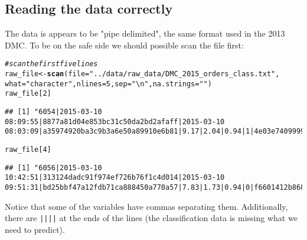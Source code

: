 \documentclass[10pt]{report}
\makeatletter
\newcommand{\hlnum}[1]{\textcolor[rgb]{0.686,0.059,0.569}{#1}}%
\newcommand{\hlstr}[1]{\textcolor[rgb]{0.192,0.494,0.8}{#1}}%
\newcommand{\hlcom}[1]{\textcolor[rgb]{0.678,0.584,0.686}{\textit{#1}}}%
\newcommand{\hlstd}[1]{\textcolor[rgb]{0.345,0.345,0.345}{#1}}%
\newcommand{\hlkwb}[1]{\textcolor[rgb]{0.69,0.353,0.396}{#1}}%
\newcommand{\hlkwc}[1]{\textcolor[rgb]{0.333,0.667,0.333}{#1}}%
\newcommand{\hlkwd}[1]{\textcolor[rgb]{0.737,0.353,0.396}{\textbf{#1}}}%
\newenvironment{kframe}{%
 \def\at@end@of@kframe{}%
 \ifinner\ifhmode%
  \def\at@end@of@kframe{\end{minipage}}%
  \begin{minipage}{\columnwidth}%
 \fi\fi%
 \def\FrameCommand##1{\hskip\@totalleftmargin \hskip-\fboxsep
 \colorbox{shadecolor}{##1}\hskip-\fboxsep
     \hskip-\linewidth \hskip-\@totalleftmargin \hskip\columnwidth}%
 \MakeFramed {\advance\hsize-\width
   \@totalleftmargin\z@ \linewidth\hsize
   \@setminipage}}%
 {\par\unskip\endMakeFramed%
 \at@end@of@kframe}
\newenvironment{knitrout}{}{} %
\makeatother
\begin{document}
\subsection{Reading the data correctly}
The data is appears to be "pipe delimited", the same format used in the 2013 DMC. 
To be on the safe side we should possible scan the file first:
\begin{knitrout}
\color{fgcolor}\begin{kframe}
\begin{alltt}
\hlcom{# scan the first five lines}
\hlstd{raw_file} \hlkwb{<-} \hlkwd{scan}\hlstd{(}\hlkwc{file} \hlstd{=} \hlstr{"../data/raw_data/DMC_2015_orders_class.txt"}\hlstd{,}
    \hlkwc{what} \hlstd{=} \hlstr{"character"}\hlstd{,} \hlkwc{nlines} \hlstd{=} \hlnum{5}\hlstd{,} \hlkwc{sep} \hlstd{=} \hlstr{"\textbackslash{}n"}\hlstd{,} \hlkwc{na.strings} \hlstd{=} \hlstr{""}\hlstd{)}
\hlstd{raw_file[}\hlnum{2}\hlstd{]}
\end{alltt}
\begin{verbatim}
## [1] "6054|2015-03-10 08:09:55|8877a81d04e853bc31c50da2bd2afaff|2015-03-10 08:03:09|a35974920ba3c9b3a6e50a89910e6b81|9.17|2.04|0.94|1|4e03e74099990e8529eb7e7328220af1|c06dc2b4a5f7ecdfa27a83acf7a29423|b7e3b0110f96213f5087034b92be487a,667daa357f8999be0805a6d62d7d3970|5d64a4abdded231d2b2bc310b13d4ed8|4.82|0.6|1.57|0||008b99d9c2fd9d58dd1483e364f8e8d3|f12c4112c9ea685dc2d2705b1448bfbc|1b950b8f844e60606af9a7afaad9e0d6|6.21|1.24|1.57|1|4e03e74099990e8529eb7e7328220af1|6cb9192a405cfe3283dc2dd4d1c8899b|796c5815752a170021838a78bf7fab34||||"
\end{verbatim}
\begin{alltt}
\hlstd{raw_file[}\hlnum{4}\hlstd{]}
\end{alltt}
\begin{verbatim}
## [1] "6056|2015-03-10 10:42:51|313124dadc91f974ef726b76f1c4d014|2015-03-10 09:51:31|bd25bbf47a12fdb71ca888450a770a57|7.83|1.73|0.94|0|f6601412b868a05c118961e9d7869bc8|920c97ba22e2235de589e5cc9b391709|b78123c345b9f8a300a7fac7a735a8bd,6f735673e0cbf770a14c38aa256011a7|9ba570a84b154eefaed3c491f7caf392|5.93|0.98|1.57|0|f6601412b868a05c118961e9d7869bc8|008b99d9c2fd9d58dd1483e364f8e8d3|f12c4112c9ea685dc2d2705b1448bfbc|daa1e02e3b7b8f55f30d5deb937ed906|3.33|2.38|0.63|1|4e03e74099990e8529eb7e7328220af1|719076d25a5d21b11a8534341545823b|796c5815752a170021838a78bf7fab34,667daa357f8999be0805a6d62d7d3970||||"
\end{verbatim}
\end{kframe}
\end{knitrout}
Notice that some of the variables have commas separating them. 
Additionally, there are \verb!||||! at the ends of the lines (the classification data is missing what we need to predict).
\end{document}
